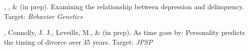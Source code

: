 \item \emsims, \jt, \& \meb (in prep). Examining the relationship between depression and delinquency. Target: \textit{Behavior Genetics}
\item \meb, Connolly, J. J., Leveille, M., \& \jjj (in prep). As time goes by: Personality predicts the timing of divorce over 45 years. Target: \textit{JPSP}
%













